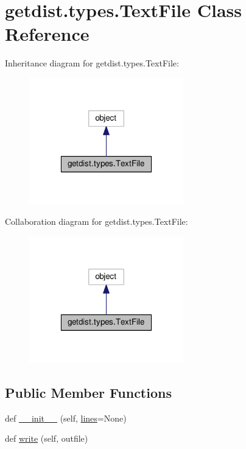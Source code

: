 \hypertarget{classgetdist_1_1types_1_1TextFile}{}\section{getdist.\+types.\+Text\+File Class Reference}
\label{classgetdist_1_1types_1_1TextFile}


Inheritance diagram for getdist.\+types.\+Text\+File\+:
\nopagebreak
\begin{figure}[H]
\begin{center}
\leavevmode
\includegraphics[width=190pt]{classgetdist_1_1types_1_1TextFile__inherit__graph}
\end{center}
\end{figure}


Collaboration diagram for getdist.\+types.\+Text\+File\+:
\nopagebreak
\begin{figure}[H]
\begin{center}
\leavevmode
\includegraphics[width=190pt]{classgetdist_1_1types_1_1TextFile__coll__graph}
\end{center}
\end{figure}
\subsection*{Public Member Functions}
\begin{DoxyCompactItemize}
\item 
def \mbox{\hyperlink{classgetdist_1_1types_1_1TextFile_a83a6875569d28fc4238977c5a4cb9fdc}{\+\_\+\+\_\+init\+\_\+\+\_\+}} (self, \mbox{\hyperlink{classgetdist_1_1types_1_1TextFile_a77909f5b9e19390f0f00f8cf7a9147c3}{lines}}=None)
\item 
def \mbox{\hyperlink{classgetdist_1_1types_1_1TextFile_a9e83c4be7d7b67c574f6a2d1eb668ccc}{write}} (self, outfile)
\end{DoxyCompactItemize}
